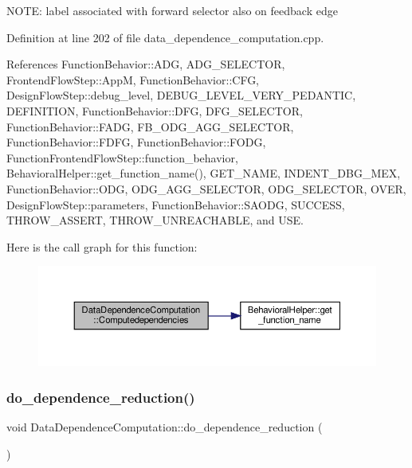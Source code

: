 N\+O\+TE\+: label associated with forward selector also on feedback edge 

Definition at line 202 of file data\+\_\+dependence\+\_\+computation.\+cpp.



References Function\+Behavior\+::\+A\+DG, A\+D\+G\+\_\+\+S\+E\+L\+E\+C\+T\+OR, Frontend\+Flow\+Step\+::\+AppM, Function\+Behavior\+::\+C\+FG, Design\+Flow\+Step\+::debug\+\_\+level, D\+E\+B\+U\+G\+\_\+\+L\+E\+V\+E\+L\+\_\+\+V\+E\+R\+Y\+\_\+\+P\+E\+D\+A\+N\+T\+IC, D\+E\+F\+I\+N\+I\+T\+I\+ON, Function\+Behavior\+::\+D\+FG, D\+F\+G\+\_\+\+S\+E\+L\+E\+C\+T\+OR, Function\+Behavior\+::\+F\+A\+DG, F\+B\+\_\+\+O\+D\+G\+\_\+\+A\+G\+G\+\_\+\+S\+E\+L\+E\+C\+T\+OR, Function\+Behavior\+::\+F\+D\+FG, Function\+Behavior\+::\+F\+O\+DG, Function\+Frontend\+Flow\+Step\+::function\+\_\+behavior, Behavioral\+Helper\+::get\+\_\+function\+\_\+name(), G\+E\+T\+\_\+\+N\+A\+ME, I\+N\+D\+E\+N\+T\+\_\+\+D\+B\+G\+\_\+\+M\+EX, Function\+Behavior\+::\+O\+DG, O\+D\+G\+\_\+\+A\+G\+G\+\_\+\+S\+E\+L\+E\+C\+T\+OR, O\+D\+G\+\_\+\+S\+E\+L\+E\+C\+T\+OR, O\+V\+ER, Design\+Flow\+Step\+::parameters, Function\+Behavior\+::\+S\+A\+O\+DG, S\+U\+C\+C\+E\+SS, T\+H\+R\+O\+W\+\_\+\+A\+S\+S\+E\+RT, T\+H\+R\+O\+W\+\_\+\+U\+N\+R\+E\+A\+C\+H\+A\+B\+LE, and U\+SE.

Here is the call graph for this function\+:
\nopagebreak
\begin{figure}[H]
\begin{center}
\leavevmode
\includegraphics[width=350pt]{d3/dc0/classDataDependenceComputation_ab155da20f80879f2c0e4006827445460_cgraph}
\end{center}
\end{figure}
\mbox{\label{classDataDependenceComputation_aa9f8b4902a09304d4c75850dfc0d0b10}} 
\subsubsection{\texorpdfstring{do\+\_\+dependence\+\_\+reduction()}{do\_dependence\_reduction()}}
{\footnotesize\ttfamily void Data\+Dependence\+Computation\+::do\+\_\+dependence\+\_\+reduction (\begin{DoxyParamCaption}{ }\end{DoxyParamCaption})\hspace{0.3cm}{\ttfamily [private]}}



